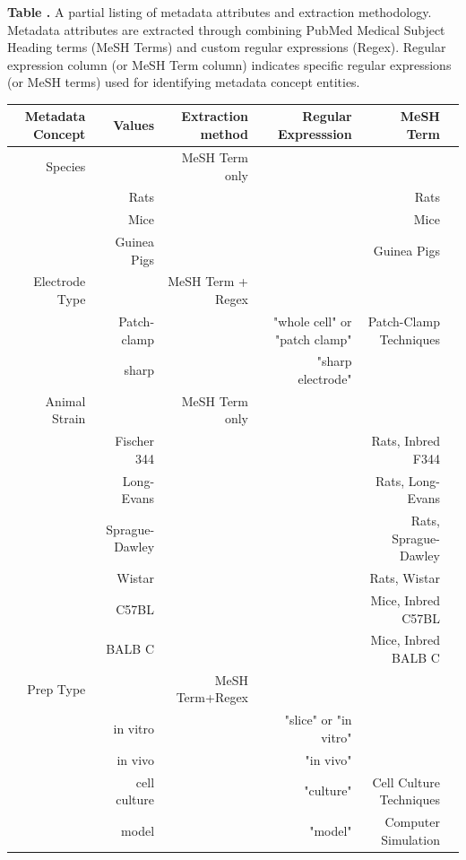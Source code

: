 \documentclass{template/frontiersSCNS} %
\begin{document}
\begin{table}[!t]
\textbf{\label{tab:metadata_id} Table .}
{A partial listing of metadata attributes and extraction methodology.  
Metadata attributes are extracted through combining PubMed Medical Subject Heading terms (MeSH Terms) and custom regular expressions (Regex).  
Regular expression column (or MeSH Term column) indicates specific regular expressions (or MeSH terms) used for identifying metadata concept entities.}
\processtable{}
{\begin{tabular}{rrrrrr}
    \toprule
    Metadata Concept & Values & Extraction method & Regular Expresssion & MeSH Term \\
    \midrule
    Species &       & MeSH Term only &       &       \\
          & Rats         &       & & Rats  \\
          & Mice         &       & & Mice  \\
          & Guinea Pigs        &       & & Guinea Pigs \\
    Electrode Type &        & MeSH Term + Regex &       &       \\
          & Patch-clamp &        & "whole cell" or "patch clamp" & Patch-Clamp Techniques  \\
          & sharp &        & "sharp electrode" &        \\
    Animal Strain &        & MeSH Term only &       &       \\
          & Fischer 344 &              & & Rats, Inbred F344 \\
          & Long-Evans &             & & Rats, Long-Evans \\
          & Sprague-Dawley &              & & Rats, Sprague-Dawley \\
          & Wistar &             & & Rats, Wistar \\
          & C57BL &              & & Mice, Inbred C57BL \\
          & BALB C &              & & Mice, Inbred BALB C \\
    Prep Type &       & MeSH Term+Regex &       &       \\
          & in vitro &        &"slice" or "in vitro" &       \\
          & in vivo &        &"in vivo" &       \\
          & cell culture &        &"culture" & Cell Culture Techniques \\
          & model &       &"model" & Computer Simulation \\

\end{tabular}}
\end{table}
\end{document}
